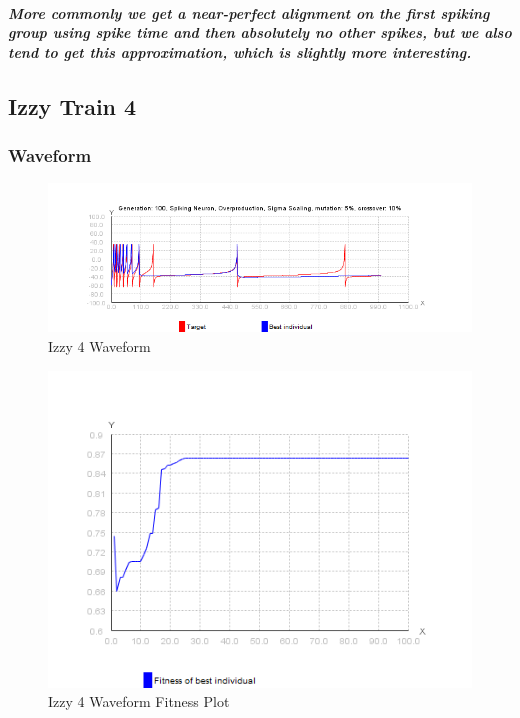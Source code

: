 \documentclass[titlepage,norsk]{article}
\begin{document}
\subparagraph{More commonly we get a near-perfect alignment on the first spiking group using spike time and then absolutely no other spikes, but we also tend to get this approximation, which is slightly more interesting.
}


\subsection{Izzy Train 4}

\subsubsection{Waveform}

\begin{figure}[h!]
\centering
\includegraphics[scale=0.75]{izzy4wave.png}
\caption{Izzy 4 Waveform}
\label{fig:awesome_image}
\end{figure}

\begin{figure}[h!]
\centering
\includegraphics[scale=0.75]{izzy4waveFitness.png}
\caption{Izzy 4 Waveform Fitness Plot}
\label{fig:awesome_image}
\end{figure}
\end{document}
